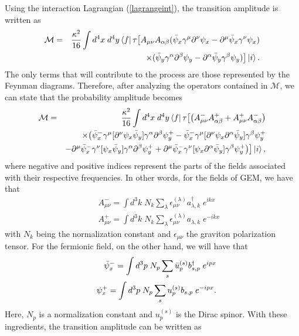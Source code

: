 \documentclass[11pt,showpacs,preprintnumbers,amsmath,amssymb,prd,nofootinbib,superscriptaddress]{revtex4-2}
\begin{document}
Using the interaction Lagrangian (\ref{lagrangeint}), the transition amplitude is written as
\begin{eqnarray}
    \mathcal{M}&=&\frac{\kappa^2}{16}\int d^4x\;d^4y\bra{f}\tau\big[A_{\mu\nu}A_{\alpha\beta}(\Bar{\psi}_x\gamma^{\mu}\partial^{\nu}\psi_x-\partial^{\mu}\Bar{\psi}_x\gamma^\nu \psi_x)\nonumber\\
    &&\times(\Bar{\psi}_y\gamma^{\alpha}\partial^{\beta}\psi_y-\partial^{\alpha}\Bar{\psi}_y\gamma^\beta \psi_y)\big]\ket{i}.
\end{eqnarray}
The only terms that will contribute to the process are those represented by the Feynman diagrams. Therefore, after analyzing the operators contained in $\mathcal{M}$, we can state that the probability amplitude becomes
\begin{eqnarray}
    \mathcal{M}&=&\frac{\kappa^2}{16}\int d^4x\;d^4y\bra{f}\tau\big[\big(A_{\mu\nu}^-A_{\alpha\beta}^+ +A_{\mu\nu}^+A_{\alpha\beta}^-\big)\nonumber\\
    &&\times\big(\Bar{\psi}^-_x\gamma^{\mu}[\partial^\nu\psi_x\Bar{\psi}_y]\gamma^{\alpha}\partial^{\beta}\psi^+_y-\Bar{\psi}^-_x\gamma^\mu[\partial^\nu\psi_x\partial^\alpha\Bar{\psi}_y]\gamma^\beta\psi_y^+\nonumber\\
    &&-\partial^\mu\Bar{\psi}^-_x\gamma^\nu[\psi_x\Bar{\psi}_y]\gamma^\alpha\partial^\beta\psi^+_y+\partial^\mu\Bar{\psi}^-_x\gamma^\nu[\psi_x\partial^\alpha\Bar{\psi}_y]\gamma^\beta\psi_y^+\big)\big]\ket{i},
\end{eqnarray}
where negative and positive indices represent the parts of the fields associated with their respective frequencies. In other words, for the fields of GEM, we have that
\begin{eqnarray}
    &&A_{\mu\nu}^-=\int d^3k\;N_k\sum_\lambda\epsilon_{\mu\nu}^{(\lambda)}a^\dagger_{\lambda,k}\;e^{ikx}\nonumber\\
    &&A_{\mu\nu}^+=\int d^3k\;N_k\sum_\lambda\epsilon_{\mu\nu}^{(\lambda)}a_{\lambda,k}\;e^{-ikx}
\end{eqnarray}
with $N_k$ being the normalization constant and $\epsilon_{\mu\nu}$ the graviton polarization tensor. For the fermionic field, on the other hand, we will have that
\begin{eqnarray}
    &&\Bar{\psi}_x^-=\int d^3p\;N_p \sum_s\Bar{u}^{(s)}_p b_{s,p}^\dagger\;e^{
ipx}\nonumber\\
&&\psi_x^+=\int d^3p\;N_p \sum_s u^{(s)}_p b_{s,p}\;e^{-ipx}.
\end{eqnarray}
Here, $N_p$ is a normalization constant and $u^{(s)}_p$ is the Dirac spinor. With these ingredients, the transition amplitude can be written as
\end{document}
